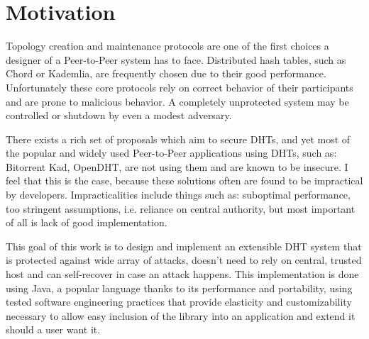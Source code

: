 \chapter{Motivation}
Topology creation and maintenance protocols are one of the first choices a
designer of a Peer-to-Peer system has to face. Distributed hash tables, such as
Chord or Kademlia, are frequently chosen due to their good performance.
Unfortunately these core protocols rely on correct behavior of their
participants and are prone to malicious behavior. A completely unprotected
system may be controlled or shutdown by even a modest adversary.

There exists a rich set of proposals which aim to secure DHTs, and yet most of
the popular and widely used Peer-to-Peer applications using DHTs, such as:
Bitorrent Kad, OpenDHT, are not using them and are known to be insecure. I feel
that this is the case, because these solutions often are found to be impractical
by developers. Impracticalities include things such as: suboptimal performance,
too stringent assumptions, i.e. reliance on central authority, but most
important of all is lack of good implementation.

This goal of this work is to design and implement an extensible DHT system
that is protected against wide array of attacks, doesn't need to rely on
central, trusted host and can self-recover in case an attack happens. This
implementation is done using Java, a popular language thanks to its performance
and portability, using tested software engineering practices that provide
elasticity and customizability necessary to allow easy inclusion of the library
into an application and extend it should a user want it.
